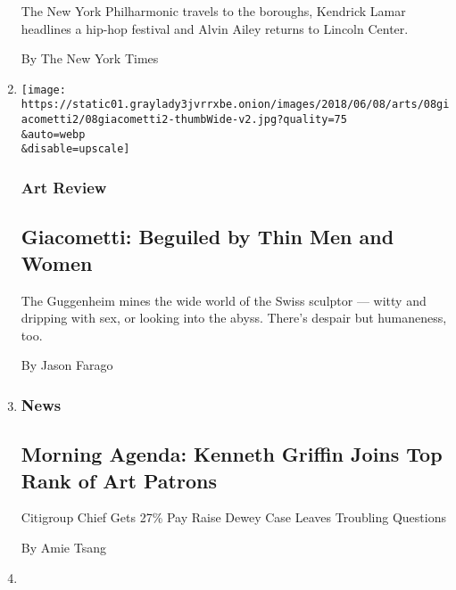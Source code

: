 \begin{enumerate}
  The New York Philharmonic travels to the boroughs, Kendrick Lamar
  headlines a hip-hop festival and Alvin Ailey returns to Lincoln
  Center.

  By The New York Times
\item
  \href{/2018/06/06/arts/design/giacometti-guggenheim-surrealism.html}{}

  \texttt{[image: https://static01.graylady3jvrrxbe.onion/images/2018/06/08/arts/08giacometti2/08giacometti2-thumbWide-v2.jpg?quality=75\\\&auto=webp\\\&disable=upscale]}

  \hypertarget{art-review}{%
  \subsubsection{Art Review}\label{art-review}}

  \hypertarget{giacometti-beguiled-by-thin-men-and-women}{%
  \subsection{Giacometti: Beguiled by Thin Men and
  Women}\label{giacometti-beguiled-by-thin-men-and-women}}

  The Guggenheim mines the wide world of the Swiss sculptor --- witty
  and dripping with sex, or looking into the abyss. There's despair but
  humaneness, too.

  By Jason Farago
\item
  \href{https://news.blogs.nytimes3xbfgragh.onion/2016/02/19/morning-agenda-kenneth-griffin-joins-top-rank-of-art-patrons/}{}

  \hypertarget{news}{%
  \subsubsection{News}\label{news}}

  \hypertarget{morning-agenda-kenneth-griffin-joins-top-rank-of-art-patrons}{%
  \subsection{Morning Agenda: Kenneth Griffin Joins Top Rank of Art
  Patrons}\label{morning-agenda-kenneth-griffin-joins-top-rank-of-art-patrons}}

  Citigroup Chief Gets 27\% Pay Raise \textbar{} Dewey Case Leaves
  Troubling Questions

  By Amie Tsang
\item
  \href{/2015/11/06/arts/design/soldier-spectre-shaman-an-alternate-history-at-moma.html}{}


\end{enumerate}
